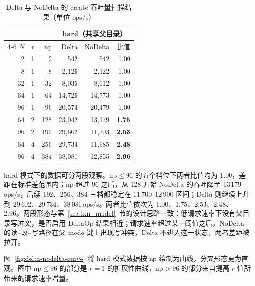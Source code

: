 \begin{table}[htbp]
    \centering
    \caption{Delta 与 NoDelta 的 create 吞吐量扫描结果（单位 ops/s）}
    \label{tab:delta-vs-nodelta-full}
    \setlength{\tabcolsep}{4pt}
    \small
    \begin{tabular}{rrrrrr}
        \toprule
        & & & \multicolumn{3}{c}{hard（共享父目录）} \\
        \cmidrule(lr){4-6}
        $N$ & $r$ & $\mathrm{np}$ & Delta & NoDelta & 比值 \\
        \midrule
        2  & 1 & 2   & 542    & 542    & 1.00          \\
        8  & 1 & 8   & 2{,}126  & 2{,}122  & 1.00          \\
        32 & 1 & 32  & 8{,}035  & 8{,}012  & 1.00          \\
        64 & 1 & 64  & 14{,}726 & 14{,}773 & 1.00          \\
        96 & 1 & 96  & 20{,}574 & 20{,}479 & 1.00          \\
        64 & 2 & 128 & 23{,}042 & 13{,}179 & \textbf{1.75} \\
        96 & 2 & 192 & 29{,}602 & 11{,}703 & \textbf{2.53} \\
        64 & 4 & 256 & 29{,}734 & 11{,}985 & \textbf{2.48} \\
        96 & 4 & 384 & 38{,}081 & 12{,}855 & \textbf{2.96} \\
        \bottomrule
    \end{tabular}
\end{table}

hard 模式下的数据可分两段观察。$\mathrm{np} \leq 96$ 的五个档位下两者比值均为 1.00，差距在标准差范围内；$\mathrm{np}$ 超过 96 之后，从 128 开始 NoDelta 的吞吐降至 13\,179\,ops/s，后续 192、256、384 三档都稳定在 11\,700--12\,900 区间；Delta 则继续上升到 29\,602、29\,734、38\,081\,ops/s。两者比值依次为 1.00、1.75、2.53、2.48、2.96。两段形态与第~\ref{sec:txn_model}~节的设计思路一致：低请求速率下没有父目录写冲突，是否启用 DeltaOp 结果相近；请求速率超过某一阈值之后，NoDelta 的读--改--写路径在父 inode 键上出现写冲突，Delta 不进入这一状态，两者差距被拉开。

图~\ref{fig:delta-nodelta-curve} 将 hard 模式数据按 $\mathrm{np}$ 绘制为曲线，分叉形态更为直观。图中 $\mathrm{np} \leq 96$ 的部分是 $r=1$ 的扩展性曲线，$\mathrm{np} > 96$ 的部分来自提高 $r$ 值所带来的请求速率增量。


